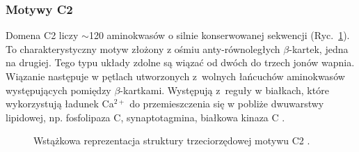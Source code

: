 \FloatBarrier
\subsubsection{Motywy C2}

Domena C2 liczy $\sim$120 aminokwasów o silnie konserwowanej sekwencji (Ryc.~\ref{fig:C2}). To charakterystyczny motyw złożony z ośmiu anty-równoległych $\beta$-kartek, jedna na drugiej. Tego typu układy zdolne są wiązać od dwóch do trzech jonów wapnia. Wiązanie następuje w pętlach utworzonych z~wolnych łańcuchów aminokwasów występujących pomiędzy $\beta$-kartkami. Występują z~reguły w białkach, które wykorzystują ładunek Ca$^{2+}$ do przemieszczenia się w pobliże dwuwarstwy lipidowej, np. fosfolipaza C, synaptotagmina, białkowa kinaza C \cite{Nalefski1996,Traore2013}.

\begin{figure}[h]
\vspace{-10pt}
\centering
\centering
\caption[Motyw C2]{Wstążkowa reprezentacja struktury trzeciorzędowej motywu C2 \cite{Traore2013}.}
 \label{fig:C2}
\end{figure}


